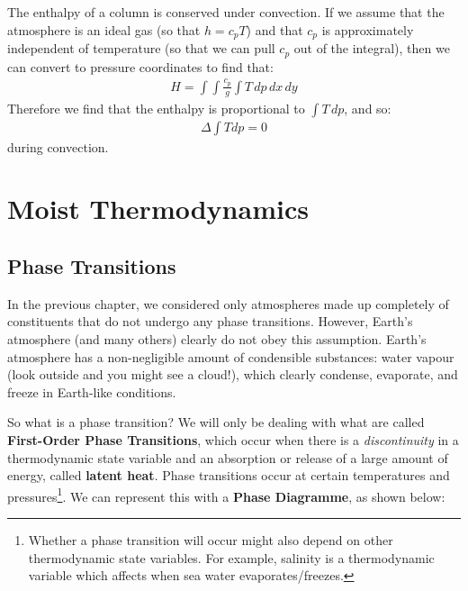 The enthalpy of a column is conserved under convection. If we assume that the atmosphere is an ideal gas (so that $h=c_pT$) and that $c_p$ is approximately independent of temperature (so that we can pull $c_p$ out of the integral), then we can convert to pressure coordinates to find that:
\begin{align*}
    H =  \int \int \frac{c_p}{g} \int  T \,dp\,dx\,dy
\end{align*}
Therefore we find that the enthalpy is proportional to $\int T\,dp$, and so:
\begin{align}
    \boxed{
        \Delta \int T dp = 0
    }
\end{align}
during convection.

\chapter{Moist Thermodynamics}\label{Moist Thermodynamics}

\section{Phase Transitions}

In the previous chapter, we considered only atmospheres made up completely of constituents that do not undergo any phase transitions. However, Earth's atmosphere (and many others) clearly do not obey this assumption. Earth's atmosphere has a non-negligible amount of condensible substances: water vapour (look outside and you might see a cloud!), which clearly condense, evaporate, and freeze in Earth-like conditions.

So what is a phase transition? We will only be dealing with what are called \textbf{First-Order Phase Transitions}, which occur when there is a \textit{discontinuity} in a thermodynamic state variable and an absorption or release of a large amount of energy, called \textbf{latent heat}. Phase transitions occur at certain temperatures and pressures\footnote{Whether a phase transition will occur might also depend on other thermodynamic state variables. For example, salinity is a thermodynamic variable which affects when sea water evaporates/freezes.}. We can represent this with a \textbf{Phase Diagramme}, as shown below:

